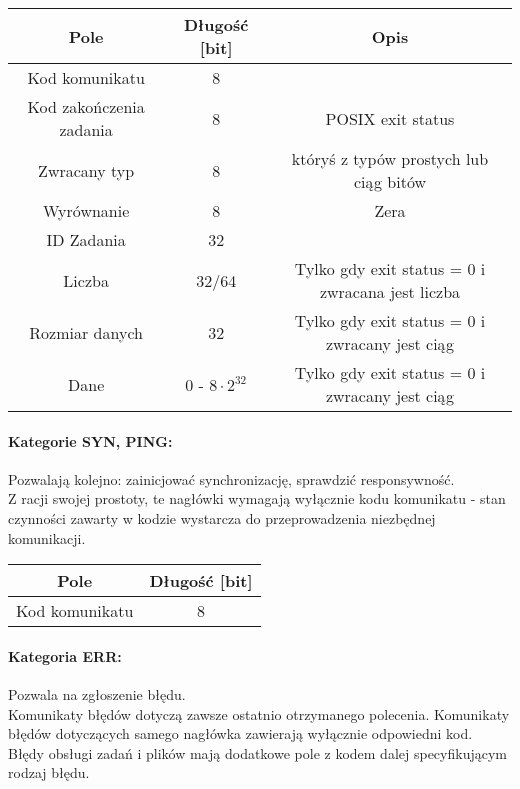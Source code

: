 \documentclass[10pt,a4paper]{article}
\begin{document}
            \begin{tabular}{ c | c | c }
			    \textbf{Pole} & \textbf{Długość [bit]} & \textbf{Opis} \\
			    \hline
			    Kod komunikatu & 8 & \\
			    Kod zakończenia zadania & 8 & POSIX exit status \\
			    Zwracany typ & 8 & któryś z typów prostych lub ciąg bitów \\
			    Wyrównanie & 8 & Zera \\
			    ID Zadania & 32 & \\
			    Liczba & 32/64 & Tylko gdy exit status = 0 i zwracana jest liczba \\
			    Rozmiar danych & 32 & Tylko gdy exit status = 0 i zwracany jest ciąg \\
			    Dane & 0 - $ 8 \cdot 2^{32} $ & Tylko gdy exit status = 0 i zwracany jest ciąg \\
			\end{tabular}
			
			\paragraph{Kategorie SYN, PING:\\}
            Pozwalają kolejno: zainicjować synchronizację, sprawdzić responsywność. \\
            Z racji swojej prostoty, te nagłówki wymagają wyłącznie kodu komunikatu - stan czynności zawarty w kodzie wystarcza do przeprowadzenia niezbędnej komunikacji.
            
            \begin{tabular}{ c | c  }
			    \textbf{Pole} & \textbf{Długość [bit]} \\
			    \hline
			    Kod komunikatu & 8 \\
			\end{tabular}
						
			\paragraph{Kategoria ERR:\\}
            Pozwala na zgłoszenie błędu. \\
            Komunikaty błędów dotyczą zawsze ostatnio otrzymanego polecenia. Komunikaty błędów dotyczących samego nagłówka zawierają wyłącznie odpowiedni kod. Błędy obsługi zadań i plików mają dodatkowe pole z kodem dalej specyfikującym rodzaj błędu. 
            
\end{document}

